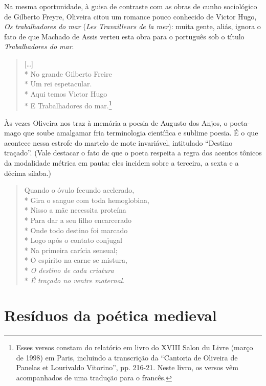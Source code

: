 Na mesma oportunidade, à guisa de contraste com as
obras de cunho sociológico de Gilberto Freyre, Oliveira
citou um romance pouco conhecido de Victor Hugo, \textit{Os trabalhadores do mar} (\textit{Les
Travailleurs de la mer}): muita gente, aliás, ignora o fato de
que Machado de Assis verteu esta obra para o português
sob o título \textit{Trabalhadores do mar}.

\begin{verse}

[\ldots]\\*
No grande Gilberto Freire\\*
Um rei espetacular.\\*
Aqui temos Victor Hugo\\*
E Trabalhadores do mar.\footnote{ Esses versos constam do relatório em
livro do XVIII Salon du Livre (março de 1998) em Paris,
incluindo a transcrição da ``Cantoria de Oliveira de
Panelas et Lourivaldo Vitorino'', pp. 216-21.
Neste livro, os versos vêm acompanhados de uma tradução
para o francês.}

\end{verse}

Às vezes Oliveira nos traz à memória a poesia de Augusto
dos Anjos, o poeta-mago que soube amalgamar fria
terminologia científica e sublime poesia. É o que acontece
nessa estrofe do martelo de mote invariável, intitulado
``Destino traçado''. (Vale destacar o fato de que o poeta 
respeita a regra dos acentos tônicos da modalidade métrica
em pauta: eles incidem sobre a terceira, a sexta e a décima
sílaba.)

\begin{verse}

Quando o óvulo fecundo acelerado,\\*
Gira o sangue com toda hemoglobina,\\*
Nisso a mãe necessita proteína\\*
Para dar a seu filho encarcerado\\*
Onde todo destino foi marcado\\*
Logo após o contato conjugal\\*
Na primeira carícia sensual;\\*
O espírito na carne se mistura,\\*
\textit{O destino de cada criatura}\\*
\textit{É traçado no ventre maternal}.

\end{verse}

\section{Resíduos da poética medieval}


